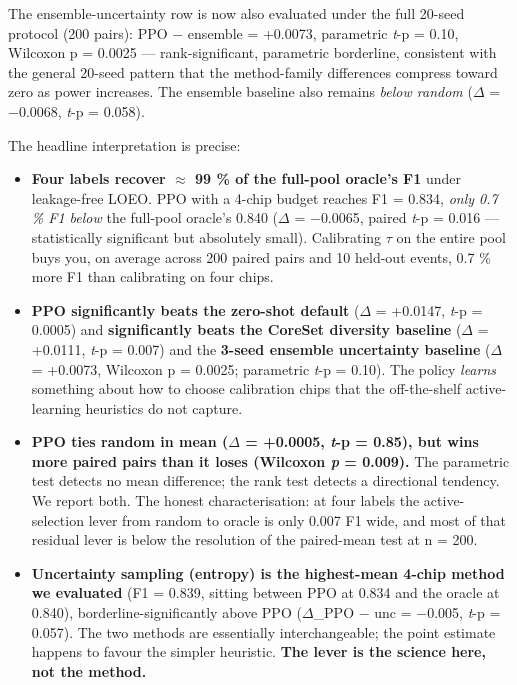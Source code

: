 \documentclass[sn-nature,lineno]{sn-jnl}
\providecommand{\tightlist}{\setlength{\itemsep}{0pt}\setlength{\parskip}{0pt}}
\theoremstyle{thmstyleone}
\theoremstyle{thmstyletwo}
\theoremstyle{thmstylethree}
\begin{document}
The ensemble-uncertainty row is now also evaluated under the full
20-seed protocol (200 pairs): PPO $-$ ensemble = +0.0073, parametric
\emph{t}-p = 0.10, Wilcoxon p = 0.0025 --- rank-significant, parametric
borderline, consistent with the general 20-seed pattern that the
method-family differences compress toward zero as power increases.
The ensemble baseline also remains \emph{below random} ($\Delta$ = $-$0.0068,
\emph{t}-p = 0.058).

The headline interpretation is precise:

\begin{itemize}
\tightlist
\item
  \textbf{Four labels recover $\approx$ 99 \% of the full-pool oracle's F1} under
  leakage-free LOEO. PPO with a 4-chip budget reaches F1 = 0.834,
  \emph{only 0.7 \% F1 below} the full-pool oracle's 0.840 ($\Delta$ = $-$0.0065,
  paired \emph{t}-p = 0.016 --- statistically significant but absolutely
  small). Calibrating $\tau$ on the entire pool buys you, on average across
  200 paired pairs and 10 held-out events, 0.7 \% more F1 than calibrating
  on four chips.
\item
  \textbf{PPO significantly beats the zero-shot default} ($\Delta$ = +0.0147,
  \emph{t}-p = 0.0005) and \textbf{significantly beats the CoreSet diversity
  baseline} ($\Delta$ = +0.0111, \emph{t}-p = 0.007) and the \textbf{3-seed ensemble
  uncertainty baseline} ($\Delta$ = +0.0073, Wilcoxon p = 0.0025;
  parametric \emph{t}-p = 0.10). The policy
  \emph{learns} something about how to choose calibration chips that the
  off-the-shelf active-learning heuristics do not capture.
\item
  \textbf{PPO ties random in mean ($\Delta$ = +0.0005, \emph{t}-p = 0.85), but wins more
  paired pairs than it loses (Wilcoxon \emph{p} = 0.009).} The parametric
  test detects no mean difference; the rank test detects a directional
  tendency. We report both. The honest characterisation: at four labels
  the active-selection lever from random to oracle is only 0.007 F1
  wide, and most of that residual lever is below the resolution of the
  paired-mean test at n = 200.
\item
  \textbf{Uncertainty sampling (entropy) is the highest-mean 4-chip method we
  evaluated} (F1 = 0.839, sitting between PPO at 0.834 and the oracle
  at 0.840), borderline-significantly above PPO ($\Delta$\_PPO $-$ unc = $-$0.005,
  \emph{t}-p = 0.057). The two methods are essentially interchangeable; the
  point estimate happens to favour the simpler heuristic. \textbf{The lever
  is the science here, not the method.}
\end{itemize}
\end{document}
